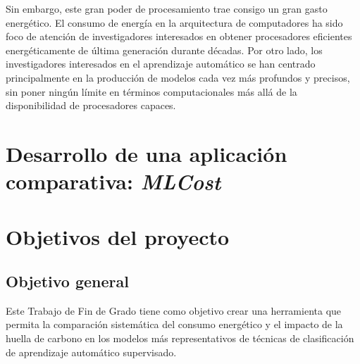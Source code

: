Sin embargo, este gran poder de procesamiento trae consigo un gran gasto energético.
El consumo de energía en la arquitectura de computadores ha sido foco de atención de investigadores interesados en obtener procesadores eficientes energéticamente de última generación durante décadas. 
Por otro lado, los investigadores interesados en el aprendizaje automático se han centrado principalmente en la producción de modelos cada vez más profundos y precisos, sin poner ningún límite en términos computacionales más allá de la disponibilidad de procesadores capaces.



\section{Desarrollo de una aplicación comparativa: \emph{MLCost}}




\section{Objetivos del proyecto}
\label{sec:objetivos}

\subsection{Objetivo general} %
\label{sec:objetivo-general} %


Este Trabajo de Fin de Grado tiene como objetivo crear una herramienta que permita la comparación sistemática del consumo energético y el impacto de la huella de carbono en los modelos más representativos de técnicas de clasificación de aprendizaje automático supervisado.


